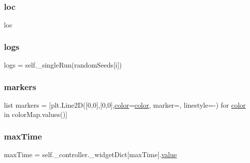\subsubsection{\texorpdfstring{loc}{loc}}
{\footnotesize\ttfamily loc\hspace{0.3cm}{\ttfamily [static]}}

\mbox{\label{class_mu_mo_t_1_1_mu_mo_tview_a37d874d1d45bc2e5bfa013cddacb8e68}} 
\subsubsection{\texorpdfstring{logs}{logs}}
{\footnotesize\ttfamily logs = self.\+\_\+single\+Run(random\+Seeds\mbox{[}i\mbox{]})\hspace{0.3cm}{\ttfamily [static]}}

\mbox{\label{class_mu_mo_t_1_1_mu_mo_tview_a6a57a88c0fcb681f5721c6b1bce2dd96}} 
\subsubsection{\texorpdfstring{markers}{markers}}
{\footnotesize\ttfamily list markers = \mbox{[}plt.\+Line2D(\mbox{[}0,0\mbox{]},\mbox{[}0,0\mbox{]},\hyperlink{class_mu_mo_t_1_1_mu_mo_tview_a37dbdc30935031c05304482e1be89d8f}{color}=\hyperlink{class_mu_mo_t_1_1_mu_mo_tview_a37dbdc30935031c05304482e1be89d8f}{color}, marker=\textquotesingle{}\textquotesingle{}, linestyle=\textquotesingle{}-\/\textquotesingle{}) for \hyperlink{class_mu_mo_t_1_1_mu_mo_tview_a37dbdc30935031c05304482e1be89d8f}{color} in color\+Map.\+values()\mbox{]}\hspace{0.3cm}{\ttfamily [static]}}

\mbox{\label{class_mu_mo_t_1_1_mu_mo_tview_aa820f7e11b025b06f4eeb0ad7581ad34}} 
\subsubsection{\texorpdfstring{max\+Time}{maxTime}}
{\footnotesize\ttfamily max\+Time = self.\+\_\+controller.\+\_\+widget\+Dict\mbox{[}\textquotesingle{}max\+Time\textquotesingle{}\mbox{]}.\hyperlink{class_mu_mo_t_1_1_mu_mo_tview_afcc7a4b78ecd8fa7e713f8cfa0f51017}{value}\hspace{0.3cm}{\ttfamily [static]}}

